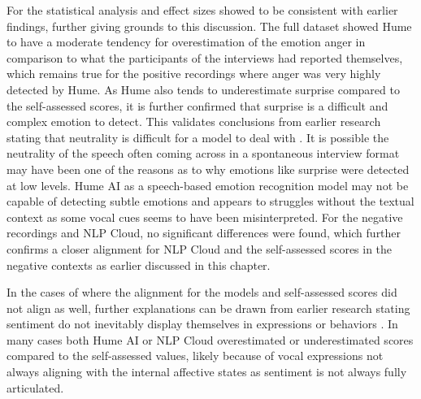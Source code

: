 For the statistical analysis and effect sizes showed to be consistent with earlier findings, further giving grounds to this discussion. 
The full dataset showed Hume to have a moderate tendency for overestimation of the emotion anger in comparison to what the participants of the interviews had reported themselves, which remains true for the positive recordings where anger was very highly detected by Hume. As Hume also tends to underestimate surprise compared to the self-assessed scores, it is further confirmed that surprise is a difficult and complex emotion to detect. This validates conclusions from earlier research stating that neutrality is difficult for a model to deal with \autocite{Cao2015}. It is possible the neutrality of the speech often coming across in a spontaneous interview format may have been one of the reasons as to why emotions like surprise were detected at low levels. Hume AI as a speech-based emotion recognition model may not be capable of detecting subtle emotions and appears to struggles without the textual context as some vocal cues seems to have been misinterpreted.
For the negative recordings and NLP Cloud, no significant differences were found, which further confirms a closer alignment for NLP Cloud and the self-assessed scores in the negative contexts as earlier discussed in this chapter.

In the cases of where the alignment for the models and self-assessed scores did not align as well, further explanations can be drawn from earlier research stating sentiment do not inevitably display themselves in expressions or behaviors \autocite{Soleymani2017}. In many cases both Hume AI or NLP Cloud overestimated or underestimated scores compared to the self-assessed values, likely because of vocal expressions not always aligning with the internal affective states as sentiment is not always fully articulated. 
